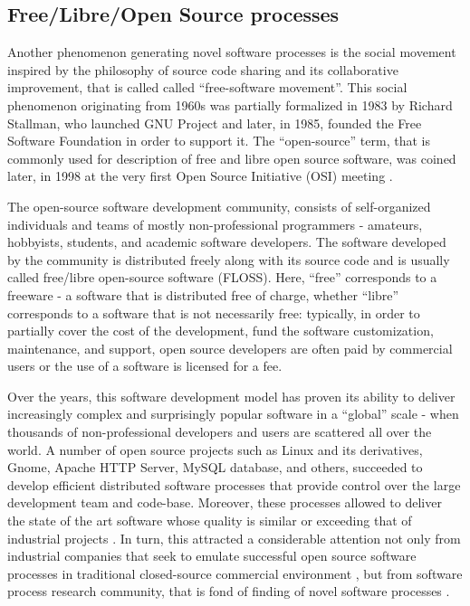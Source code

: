 %
%
\subsection{Free/Libre/Open Source processes}\label{sec_floss_processes}
Another phenomenon generating novel software processes is the social movement inspired by the philosophy 
of source code sharing and its collaborative improvement, that is called called ``free-software movement''. 
This social phenomenon originating from 1960s was partially formalized in 1983 by Richard Stallman,
who launched GNU Project and later, in 1985, founded the Free Software Foundation in order to support 
it. The ``open-source'' term, that is commonly used for description of free and libre open source software, 
was coined later, in 1998 at the very first Open Source Initiative (OSI) meeting \cite{osi-history}.

The open-source software development community, consists of self-organized individuals and teams of 
mostly non-professional programmers - amateurs, hobbyists, students, and academic software developers. 
The software developed by the community is distributed freely along with its source code and is 
usually called free/libre open-source software (FLOSS). Here, ``free'' corresponds to a freeware - 
a software that is distributed free of charge, whether ``libre'' corresponds to a software that is 
not necessarily free: typically, in order to partially cover the cost of the development, 
fund the software customization, maintenance, and support, open source developers are often paid 
by commercial users or the use of a software is licensed for a fee.

Over the years, this software development model has proven its ability to deliver increasingly complex 
and surprisingly popular software in a ``global'' scale - when thousands of non-professional developers 
and users are scattered all over the world. A number of open source projects such as Linux and its 
derivatives, Gnome, Apache HTTP Server, MySQL database, and others, succeeded to develop efficient 
distributed software processes that provide control over the large development team and code-base.
Moreover, these processes allowed to deliver the state of the art software whose quality is similar 
or exceeding that of industrial projects \cite{coverity2012}. 
In turn, this attracted a considerable attention not only from industrial companies that seek to emulate 
successful open source software processes in traditional closed-source commercial environment 
\cite{oss_virtual_organizations} \cite{oss_balance} \cite{oss_hp} \cite{oss_4industry}, 
but from software process research community, that is fond of finding of novel software processes
\cite{citeulike:12550640} \cite{citeulike:5043664} \cite{citeulike:5128808} \cite{citeulike:10377366}.

